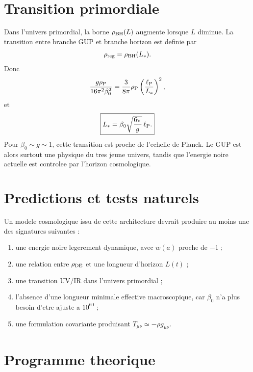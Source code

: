 \documentclass[11pt,a4paper]{article}
\newcommand{\rhoP}{\rho_{\rm P}}
\newcommand{\ellP}{\ell_{\rm P}}
\newcommand{\rhoDE}{\rho_{\rm DE}}
\newcommand{\rhoReg}{\rho_{\rm reg}}
\newcommand{\rhoBH}{\rho_{\rm BH}}
\begin{document}
\section{Transition primordiale}

Dans l'univers primordial, la borne $\rhoBH(L)$ augmente lorsque $L$ diminue.
La transition entre branche GUP et branche horizon est definie par
\begin{equation}
\rhoReg=\rhoBH(L_*).
\end{equation}
Donc
\begin{equation}
\frac{g\rhoP}{16\pi^2\beta_0^2}
=
\frac{3}{8\pi}\rhoP\left(\frac{\ellP}{L_*}\right)^2,
\end{equation}
et
\begin{equation}
\boxed{
L_*=\beta_0\sqrt{\frac{6\pi}{g}}\,\ellP.
}
\label{eq:l_star}
\end{equation}
Pour $\beta_0\sim g\sim1$, cette transition est proche de l'echelle de
Planck. Le GUP est alors surtout une physique du tres jeune univers, tandis que
l'energie noire actuelle est controlee par l'horizon cosmologique.

\section{Predictions et tests naturels}

Un modele cosmologique issu de cette architecture devrait produire au moins une
des signatures suivantes :
\begin{enumerate}
 \item une energie noire legerement dynamique, avec $w(a)$ proche de $-1$ ;
 \item une relation entre $\rhoDE$ et une longueur d'horizon $L(t)$ ;
 \item une transition UV/IR dans l'univers primordial ;
 \item l'absence d'une longueur minimale effective macroscopique, car
 $\beta_0$ n'a plus besoin d'etre ajuste a $10^{60}$ ;
 \item une formulation covariante produisant $T_{\mu\nu}\simeq-\rho g_{\mu\nu}$.
\end{enumerate}

\section{Programme theorique}
\end{document}
